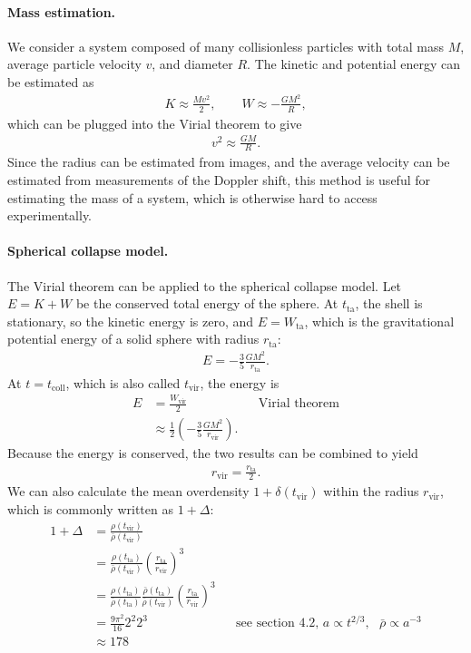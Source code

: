 \paragraph*{Mass estimation.}
We consider a system composed of many collisionless particles with total mass $M$, average particle velocity $v$, and diameter $R$.
The kinetic and potential energy can be estimated as
\begin{align*}
	K \approx \frac{M v^2}{2}, \qquad
	W \approx - \frac{G M^2}{R},
\end{align*}
which can be plugged into the Virial theorem to give
\begin{align*}
	v^2 \approx \frac{G M}{R}.
\end{align*}
Since the radius can be estimated from images, and the average velocity can be estimated from measurements of the Doppler shift, this method is useful for estimating the mass of a system, which is otherwise hard to access experimentally. 


\paragraph*{Spherical collapse model.}
The Virial theorem can be applied to the spherical collapse model.
Let $E = K + W$ be the conserved total energy of the sphere.
At $t_\text{ta}$, the shell is stationary, so the kinetic energy is zero, and $E = W_\text{ta}$, which is the gravitational potential energy of a solid sphere with radius $r_\text{ta}$:
\begin{align*}
	E = - \frac{3}{5} \frac{G M^2}{r_\text{ta}}.
\end{align*}
At $t = t_\text{coll}$, which is also called $t_\text{vir}$, the energy is
\begin{align*}
	E
	&= \frac{W_\text{vir}}{2}
	&&\text{Virial theorem}\\
	&\approx \frac{1}{2}\left( - \frac{3}{5} \frac{GM^2}{r_\text{vir}} \right).
\end{align*}
Because the energy is conserved, the two results can be combined to yield
\begin{align*}
	r_\text{vir} = \frac{r_\text{ta}}{2}.
\end{align*}
We can also calculate the mean overdensity $1 + \delta(t_\text{vir})$ within the radius $r_\text{vir}$, which is commonly written as $1 + \Delta$:
\begin{align*}
	1 + \Delta
	&= \frac{\rho(t_\text{vir})}{\bar{\rho}(t_\text{vir})}\\
	&= \frac{ \rho(t_\text{ta})}{\bar{\rho}(t_\text{vir})}
	\left(\frac{r_\text{ta}}{r_\text{vir}}\right)^3\\
	&= \frac{\rho(t_\text{ta})}{\bar{\rho}(t_\text{ta})}
	\frac{\bar{\rho}(t_\text{ta})}{\bar{\rho}(t_\text{vir})}
	\left( \frac{r_\text{ta}}{r_\text{vir}} \right)^3\\
	&= \frac{9\pi^2}{16}   2^2 2^3
	&&\text{see section 4.2, } a \propto t^{2/3}, \text{ } \bar{\rho} \propto a^{-3}\\
	&\approx 178
\end{align*}

